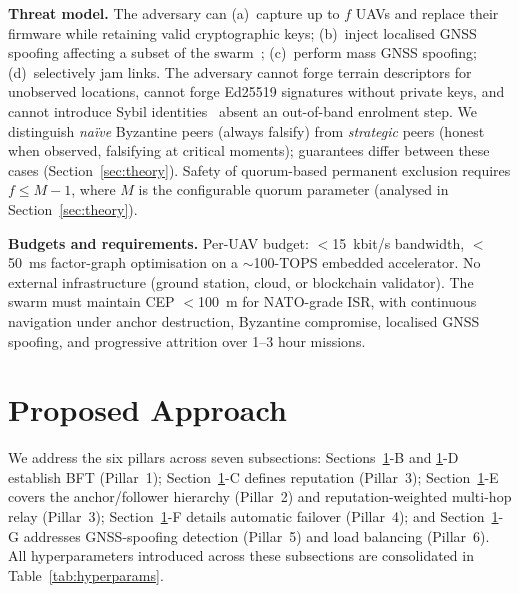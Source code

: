 \documentclass[conference,10pt]{IEEEtran}
\begin{document}
\textbf{Threat model.} The adversary can (a)~capture up to $f$ UAVs and replace their firmware while retaining valid cryptographic keys; (b)~inject localised GNSS spoofing affecting a subset of the swarm~\cite{tippenhauer2011gps}; (c)~perform mass GNSS spoofing; (d)~selectively jam links. The adversary cannot forge terrain descriptors for unobserved locations, cannot forge Ed25519 signatures without private keys, and cannot introduce Sybil identities~\cite{douceur2002sybil} absent an out-of-band enrolment step. We distinguish \emph{na\"ive} Byzantine peers (always falsify) from \emph{strategic} peers (honest when observed, falsifying at critical moments); guarantees differ between these cases (Section~\ref{sec:theory}). Safety of quorum-based permanent exclusion requires $f \leq M-1$, where $M$ is the configurable quorum parameter (analysed in Section~\ref{sec:theory}).

\textbf{Budgets and requirements.} Per-UAV budget: $<$15~kbit/s bandwidth, $<$50~ms factor-graph optimisation on a $\sim$100-TOPS embedded accelerator. No external infrastructure (ground station, cloud, or blockchain validator). The swarm must maintain CEP $<$100~m for NATO-grade ISR, with continuous navigation under anchor destruction, Byzantine compromise, localised GNSS spoofing, and progressive attrition over 1--3 hour missions.

\section{Proposed Approach}
\label{sec:approach}

We address the six pillars across seven subsections: Sections~\ref{sec:approach}-B and \ref{sec:approach}-D establish BFT (Pillar~1); Section~\ref{sec:approach}-C defines reputation (Pillar~3); Section~\ref{sec:approach}-E covers the anchor/follower hierarchy (Pillar~2) and reputation-weighted multi-hop relay (Pillar~3); Section~\ref{sec:approach}-F details automatic failover (Pillar~4); and Section~\ref{sec:approach}-G addresses GNSS-spoofing detection (Pillar~5) and load balancing (Pillar~6). All hyperparameters introduced across these subsections are consolidated in Table~\ref{tab:hyperparams}.
\end{document}
